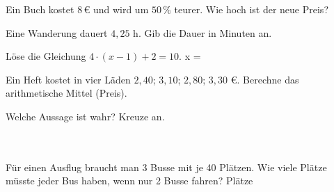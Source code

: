 \documentclass[11pt]{article}
\begin{document}
\noindent\begin{minipage}[t]{0.485\linewidth}\raggedright
\begin{aufgabe}{Ein Buch kostet $8\,€$ und wird um $50\,\%$ teurer. Wie hoch ist der neue Preis? \leerfeld[€]}
\end{aufgabe}
\end{minipage}\hfill\begin{minipage}[t]{0.485\linewidth}\raggedright
\begin{aufgabe}{Eine Wanderung dauert $4{,}25$ h. Gib die Dauer in Minuten an. \leerfeld[min]}
\end{aufgabe}
\end{minipage}\par

\noindent\begin{minipage}[t]{0.485\linewidth}\raggedright
\begin{aufgabe}{Löse die Gleichung $4 \cdot (x - 1) + 2 = 10$. x = \leerfeld}
\end{aufgabe}
\end{minipage}\hfill\begin{minipage}[t]{0.485\linewidth}\raggedright
\begin{aufgabe}{Ein Heft kostet in vier Läden $2{,}40$; $3{,}10$; $2{,}80$; $3{,}30$ €. Berechne das arithmetische Mittel (Preis). \leerfeld[€]}
\end{aufgabe}
\end{minipage}\par

\begin{aufgabe}{Welche Aussage ist wahr? Kreuze an.\\ \\ \\ }
\end{aufgabe}

\begin{aufgabe}{Für einen Ausflug braucht man 3 Busse mit je 40 Plätzen. Wie viele Plätze müsste jeder Bus haben, wenn nur 2 Busse fahren? \leerfeld Plätze}
\end{aufgabe}
\end{document}
